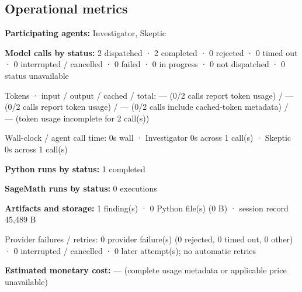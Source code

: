 \documentclass[11pt]{article}
\begin{document}
\subsection{Operational metrics}
\textbf{Participating agents:} Investigator, Skeptic\par
\textbf{Model calls by status:} 2 dispatched · 2 completed · 0 rejected · 0 timed out · 0 interrupted / cancelled · 0 failed · 0 in progress · 0 not dispatched · 0 status unavailable\par
Tokens · input / output / cached / total: — (0/2 calls report token usage) / — (0/2 calls report token usage) / — (0/2 calls include cached-token metadata) / — (token usage incomplete for 2 call(s))\par
Wall-clock / agent call time: 0s wall · Investigator 0s across 1 call(s) · Skeptic 0s across 1 call(s)\par
\textbf{Python runs by status:} 1 completed\par
\textbf{SageMath runs by status:} 0 executions\par
\textbf{Artifacts and storage:} 1 finding(s) · 0 Python file(s) (0 B) · session record 45,489 B\par
Provider failures / retries: 0 provider failure(s) (0 rejected, 0 timed out, 0 other) · 0 interrupted / cancelled · 0 later attempt(s); no automatic retries\par
\textbf{Estimated monetary cost:} — (complete usage metadata or applicable price unavailable)\par
\end{document}
